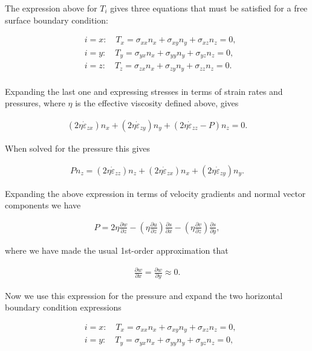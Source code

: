 The expression above for $T_i$ gives three equations that must be satisfied for a free surface boundary condition:

\begin{align*}
  & i=x:\quad T_{x}=\sigma _{xx}n_{x}+\sigma _{xy}n_{y}+\sigma _{xz}n_{z}=0, \\ 
 & i=y:\quad T_{y}=\sigma _{yx}n_{x}+\sigma _{yy}n_{y}+\sigma _{yz}n_{z}=0, \\ 
 & i=z:\quad T_{z}=\sigma _{zx}n_{x}+\sigma _{zy}n_{y}+\sigma _{zz}n_{z}=0. \\ 
\end{align*}

Expanding the last one and expressing stresses in terms of strain rates and pressures, where $\eta$ is the effective viscosity defined above, gives

\begin{align*}
\left( 2\eta \dot{\varepsilon }_{zx} \right)n_{x}+\left( 2\eta \dot{\varepsilon }_{zy} \right)n_{y}+\left( 2\eta \dot{\varepsilon }_{zz}-P \right)n_{z}=0.
\end{align*}

When solved for the pressure this gives

\begin{align*}
Pn_{z}=\left( 2\eta \dot{\varepsilon }_{zz} \right)n_{z}+\left( 2\eta \dot{\varepsilon }_{zx} \right)n_{x}+\left( 2\eta \dot{\varepsilon }_{zy} \right)n_{y}.
\end{align*}

Expanding the above expression in terms of velocity gradients and normal vector components we have

\begin{align*}
P=2\eta \frac{\partial w}{\partial z}-\left( \eta \frac{\partial u}{\partial z} \right)\frac{\partial s}{\partial x}-\left( \eta \frac{\partial v}{\partial z} \right)\frac{\partial s}{\partial y},
\end{align*}

where we have made the usual 1st-order approximation that 

\begin{align*}
\frac{\partial w}{\partial x}=\frac{\partial w}{\partial y}\approx 0.
\end{align*}

Now we use this expression for the pressure and expand the two horizontal boundary condition expressions

\begin{align*}
  & i=x:\quad T_{x}=\sigma _{xx}n_{x}+\sigma _{xy}n_{y}+\sigma _{xz}n_{z}=0, \\ 
 & i=y:\quad T_{y}=\sigma _{yx}n_{x}+\sigma _{yy}n_{y}+\sigma _{yz}n_{z}=0, \\
 \end{align*}

